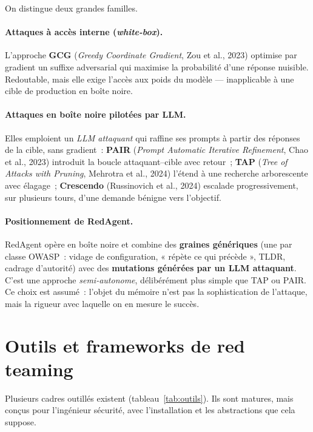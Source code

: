 On distingue deux grandes familles.

\paragraph{Attaques à accès interne (\emph{white-box}).} L'approche \textbf{GCG} (\emph{Greedy Coordinate Gradient}, Zou et al., 2023) optimise par gradient un suffixe adversarial qui maximise la probabilité d'une réponse nuisible. Redoutable, mais elle exige l'accès aux poids du modèle — inapplicable à une cible de production en boîte noire.

\paragraph{Attaques en boîte noire pilotées par LLM.} Elles emploient un \emph{LLM attaquant} qui raffine ses prompts à partir des réponses de la cible, sans gradient~: \textbf{PAIR} (\emph{Prompt Automatic Iterative Refinement}, Chao et al., 2023) introduit la boucle attaquant–cible avec retour~; \textbf{TAP} (\emph{Tree of Attacks with Pruning}, Mehrotra et al., 2024) l'étend à une recherche arborescente avec élagage~; \textbf{Crescendo} (Russinovich et al., 2024) escalade progressivement, sur plusieurs tours, d'une demande bénigne vers l'objectif.

\paragraph{Positionnement de RedAgent.} RedAgent opère en boîte noire et combine des \textbf{graines génériques} (une par classe OWASP~: vidage de configuration, « répète ce qui précède », TLDR, cadrage d'autorité) avec des \textbf{mutations générées par un LLM attaquant}. C'est une approche \emph{semi-autonome}, délibérément plus simple que TAP ou PAIR. Ce choix est assumé~: l'objet du mémoire n'est pas la sophistication de l'attaque, mais la rigueur avec laquelle on en mesure le succès.

\section{Outils et frameworks de red teaming}

Plusieurs cadres outillés existent (tableau~\ref{tab:outils}). Ils sont matures, mais conçus pour l'ingénieur sécurité, avec l'installation et les abstractions que cela suppose.

